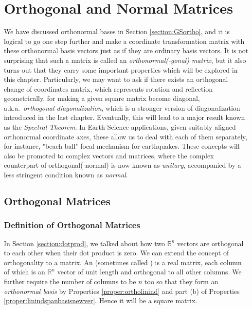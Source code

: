\chapter{Orthogonal and Normal Matrices}
\label{chap:normalmat}

We have discussed orthonormal bases in Section \ref{section:GSortho}, and it is logical to go one step further and make a coordinate transformation matrix with these orthonormal basis vectors just as if they are ordinary basis vectors. It is not surprising that such a matrix is called an \textit{orthonormal(-gonal) matrix}, but it also turns out that they carry some important properties which will be explored in this chapter. Particularly, we may want to ask if there exists an orthogonal change of coordinates matrix, which represents rotation and reflection geometrically, for making a given square matrix become diagonal, a.k.a.\ \textit{orthogonal diagonalization}, which is a stronger version of diagonalization introduced in the last chapter. Eventually, this will lead to a major result known as the \textit{Spectral Theorem}. In Earth Science applications, given suitably aligned orthonormal coordinate axes, these allow us to deal with each of them separately, for instance, "beach ball" focal mechanism for earthquakes. These concepts will also be promoted to complex vectors and matrices, where the complex counterpart of orthogonal(-normal) is now known as \textit{unitary}, accompanied by a less stringent condition known as \textit{normal}. 

\section{Orthogonal Matrices}

\subsection{Definition of Orthogonal Matrices}
In Section \ref{section:dotprod}, we talked about how two $\mathbb{R}^n$ vectors are orthogonal to each other when their dot product is zero. We can extend the concept of orthogonality to a matrix. An  (sometimes called ) is a real matrix, each column of which is an $\mathbb{R}^n$ vector of unit length and orthogonal to all other columns. We further require the number of columns to be $n$ too so that they form an \textit{orthonormal basis} by Properties \ref{proper:ortholinind} and part (b) of Properties \ref{proper:linindspanbasisnewver}. Hence it will be a square matrix.

